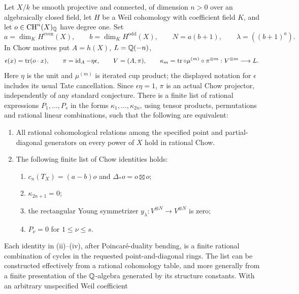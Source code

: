 \begin{theorem}
\label{c:finite-unconditional-criterion}
Let $X/k$ be smooth projective and connected, of dimension $n>0$
over an algebraically closed field, let $H$ be a Weil cohomology
with coefficient field $K$, and let
$o\in\operatorname{CH}^n(X)_\mathbb Q$ have degree one.  Set
\[
 a=\dim_K H^{\mathrm{even}}(X),\qquad
 b=\dim_K H^{\mathrm{odd}}(X),\qquad
 N=a(b+1),\qquad \lambda=((b+1)^a).
\]
In Chow motives put $A=h(X)$, $L=\mathbb Q(-n)$,
\[
 \epsilon(x)=\operatorname{tr}(o\cdot x),\qquad
 \pi=\operatorname{id}_A-\eta\epsilon,\qquad V=(A,\pi),
 \qquad
 \kappa_m=\operatorname{tr}\circ\mu^{(m)}\circ\pi^{\otimes m}
       :V^{\otimes m}\longrightarrow L.
\]
Here $\eta$ is the unit and $\mu^{(m)}$ is iterated cup product;
the displayed notation for $\epsilon$ includes its usual Tate
cancellation.  Since $\epsilon\eta=1$, $\pi$ is an actual Chow
projector, independently of any standard conjecture.  There is
a finite list of rational expressions $P_1,\ldots,P_s$ in the
forms $\kappa_1,\ldots,\kappa_{2n}$, using tensor products,
permutations and rational linear combinations, such that the
following are equivalent:
\begin{enumerate}[label=(\Alph*)]
\item All rational cohomological relations among the specified
      point and partial-diagonal generators on every power of $X$
      hold in rational Chow.
\item The following finite list of Chow identities holds:
      \begin{enumerate}[label=(\roman*)]
      \item $c_n(T_X)=(a-b)o$ and $\Delta_*o=o\boxtimes o$;
      \item $\kappa_{2n+1}=0$;
      \item the rectangular Young symmetrizer
            $y_\lambda:V^{\otimes N}\to V^{\otimes N}$ is zero;
      \item $P_\nu=0$ for $1\leq\nu\leq s$.
      \end{enumerate}
\end{enumerate}
Each identity in (ii)--(iv), after Poincar\'e-duality bending,
is a finite rational combination of cycles in the requested
point-and-diagonal rings.  The list can be constructed effectively
from a rational cohomology table, and more generally from a finite
presentation of the $\mathbb Q$-algebra generated by its structure
constants.  With an arbitrary unspecified Weil coefficient

\end{theorem}
